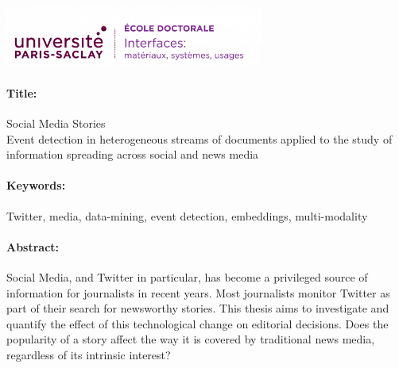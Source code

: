 \fontsize{14}{16}\selectfont
\begin{singlespace}
\setlength{\parindent}{0pt}
\ifthispageodd{\newpage\thispagestyle{empty}\null\newpage}{}
\thispagestyle{empty}
\vspace*{-2.5cm}%
\enlargethispage{10cm}


\includegraphics[height=2cm]{media/ed/ed-interfaces-h.png}
\vspace{.2cm}
\fontsize{11}{13}\selectfont
\begin{mdframed}[linecolor=Prune,linewidth=1]

\vspace{-.25cm}
\paragraph*{Title:} Social Media Stories\\
Event detection in heterogeneous streams of documents applied to the study of information spreading across social and news media


\vspace{-.25cm}
\paragraph*{Keywords:} Twitter, media, data-mining, event detection, embeddings, multi-modality

\vspace{-.5cm}
\begin{multicols}{2}
\paragraph*{Abstract:} Social Media, and Twitter in particular, has become a privileged source of information for journalists in recent years. Most journalists monitor Twitter as part of their search for newsworthy stories. This thesis aims to investigate and quantify the effect of this technological change on editorial decisions. Does the popularity of a story affect the way it is covered by traditional news media, regardless of its intrinsic interest?


\end{multicols}
\end{mdframed}
\end{singlespace}
